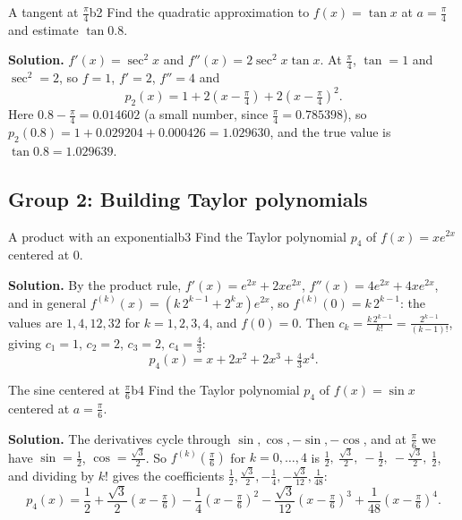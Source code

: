 \documentclass[11pt]{article}
\begin{document}
\begin{exmp}{A tangent at $\frac\pi4$}{b2}
Find the quadratic approximation to $f(x)=\tan x$ at $a=\frac\pi4$ and estimate $\tan0.8$.

\textbf{Solution.} $f'(x)=\sec^2x$ and $f''(x)=2\sec^2x\tan x$. At $\frac\pi4$, $\tan=1$ and $\sec^2=2$, so $f=1$, $f'=2$, $f''=4$ and
\[
p_2(x)=1+2\left(x-\tfrac\pi4\right)+2\left(x-\tfrac\pi4\right)^2 .
\]
Here $0.8-\frac\pi4=0.014602$ (a small number, since $\frac\pi4=0.785398$), so $p_2(0.8)=1+0.029204+0.000426=1.029630$, and the true value is $\tan0.8=1.029639$.
\end{exmp}

\subsection*{Group 2: Building Taylor polynomials}

\begin{exmp}{A product with an exponential}{b3}
Find the Taylor polynomial $p_4$ of $f(x)=xe^{2x}$ centered at $0$.

\textbf{Solution.} By the product rule, $f'(x)=e^{2x}+2xe^{2x}$, $f''(x)=4e^{2x}+4xe^{2x}$, and in general $f^{(k)}(x)=(k\,2^{k-1}+2^kx)e^{2x}$, so $f^{(k)}(0)=k\,2^{k-1}$: the values are $1,4,12,32$ for $k=1,2,3,4$, and $f(0)=0$. Then $c_k=\frac{k\,2^{k-1}}{k!}=\frac{2^{k-1}}{(k-1)!}$, giving $c_1=1$, $c_2=2$, $c_3=2$, $c_4=\frac43$:
\[
p_4(x)=x+2x^2+2x^3+\tfrac43x^4 .
\]
\end{exmp}

\begin{exmp}{The sine centered at $\frac\pi6$}{b4}
Find the Taylor polynomial $p_4$ of $f(x)=\sin x$ centered at $a=\frac\pi6$.

\textbf{Solution.} The derivatives cycle through $\sin,\cos,-\sin,-\cos$, and at $\frac\pi6$ we have $\sin=\frac12$, $\cos=\frac{\sqrt3}2$. So $f^{(k)}(\frac\pi6)$ for $k=0,\dots,4$ is $\frac12,\ \frac{\sqrt3}2,\ -\frac12,\ -\frac{\sqrt3}2,\ \frac12$, and dividing by $k!$ gives the coefficients $\frac12,\frac{\sqrt3}2,-\frac14,-\frac{\sqrt3}{12},\frac1{48}$:
\[
p_4(x)=\frac12+\frac{\sqrt3}2\left(x-\tfrac\pi6\right)-\frac14\left(x-\tfrac\pi6\right)^2-\frac{\sqrt3}{12}\left(x-\tfrac\pi6\right)^3+\frac1{48}\left(x-\tfrac\pi6\right)^4 .
\]
\end{exmp}
\end{document}
